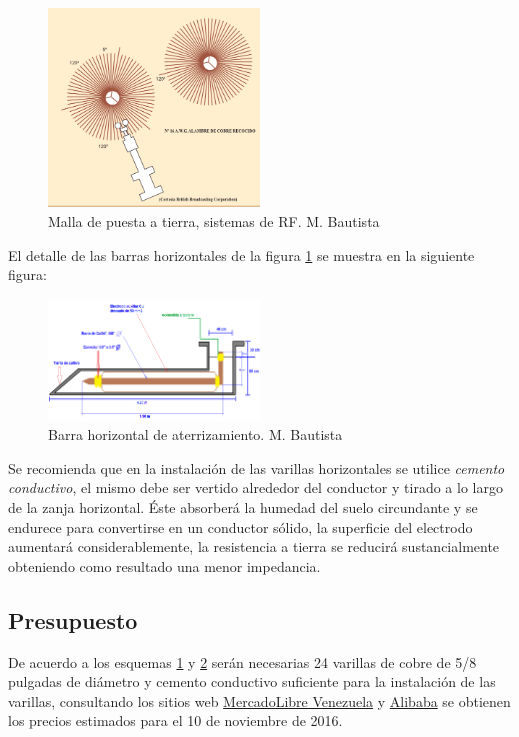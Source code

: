 \documentclass[11pt, a4paper, twosides]{report}
\begin{document}
\begin{figure}[h]
    \centering
    \includegraphics[width=0.5\textwidth]{fig14.png}
    \caption{Malla de puesta a tierra, sistemas de RF. M. Bautista}
    \label{fig:pt}
\end{figure}

El detalle de las barras horizontales de la figura \ref{fig:pt} se muestra en la siguiente figura:

\begin{figure}[h]
    \centering
    \includegraphics[width=0.5\textwidth]{fig15.png}
    \caption{Barra horizontal de aterrizamiento. M. Bautista}
    \label{fig:15}
\end{figure}

Se recomienda que en la instalación de las varillas horizontales se utilice \textit{cemento conductivo}, el mismo debe ser vertido alrededor del conductor y tirado a lo largo de la zanja horizontal. Éste absorberá la humedad del suelo circundante y se endurece para convertirse en un conductor sólido, la superficie del electrodo aumentará considerablemente, la resistencia a tierra se reducirá sustancialmente obteniendo como resultado una menor impedancia.

\subsection{Presupuesto}
De acuerdo a los esquemas \ref{fig:pt} y \ref{fig:15} serán necesarias 24 varillas de cobre de 5/8 pulgadas de diámetro y cemento conductivo suficiente para la instalación de las varillas, consultando los sitios web \href{http://www.mercadolibre.com.ve/}{MercadoLibre Venezuela} y \href{https://www.alibaba.com/}{Alibaba} se obtienen los precios estimados para el 10 de noviembre de 2016.
\end{document}
